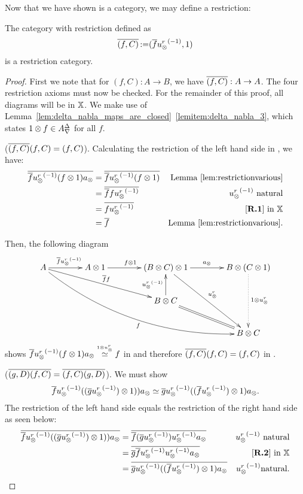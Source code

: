 Now that we have shown \Xt is a category, we may define a restriction:

\begin{lemma}\label{lem:xt_is_a_restriction_category}
  The category \Xt with restriction defined as
  \[
    \overline{(f,C)} \operatorname*{:\!=} (\overline{f}{u_{\otimes}^r}^{(-1)},1)
  \]
 is a restriction category.
\end{lemma}
\begin{proof}
  First we note that for $(f,C):A\to B$, we have $\overline{(f,C)}:A\to A$.
  The four restriction axioms must now be checked. For the remainder of
  this proof, all diagrams will be in $\mathbb{X}$. We make use of
  Lemma~\ref{lem:delta_nabla_maps_are_closed}~\ref{lemitem:delta_nabla_3},  which states $1\otimes f \in
  {A}^{\Delta}_{\nabla}$ for all $f$.

  \rone ($\overline{(f,C)} (f,C) = (f,C)$). Calculating the restriction of the left hand side in
      \X, we have:
      \begin{align*}
        \restr{\rst{f}\inv{\usr} (f\*1) a_{\*}} & = \restr{\rst{f}\inv{\usr} (f\*1)}
          & \text{Lemma \ref{lem:restrictionvarious}}\\
        & = \restr{\rst{f}f \inv{\usr}}  & \inv{\usr} \text{ natural}\\
        & = \restr{f \inv{\usr}}  & \text{ \rone in }\X\\
        & = \restr{f } & \text{Lemma \ref{lem:restrictionvarious}}.
      \end{align*}

      Then, the following diagram
      \[
        \xymatrix @C=40pt @R=25pt{
          A \ar[r]^{\restr{f} \inv{\usr}}
          \ar @/_25pt/[ddrrr]_f  \ar[drr]^{\restr{f}f}
          &A \* 1 \ar[r]^{f\* 1}
          &(B \* C) \* 1 \ar[r]^{a_{\*}} \ar[ddr]^{\usr}
          &B \* (C \* 1) \ar@{.>}[dd]^{1 \* {\usr}}\\
          &&B\*C \ar[u]^{\inv{\usr}} \ar@{=} [dr]\\
          && &B \* C
        }
      \]
      shows $\overline{f}{u_{\otimes}^r}^{(-1)} (f\otimes1) a_{\otimes} \overset{\scriptscriptstyle 1 \otimes {\ensuremath{u_{\otimes}^r}}}{\simeq} f$ in \X and therefore
      $\overline{(f,C)} (f,C) = (f,C)$ in \Xt.

     \rtwo ($\overline{(g,D)} \overline{(f,C)} = \overline{(f,C)} \overline{(g,D)}$). We must show
      \begin{equation}
        \overline{f}{u_{\otimes}^r}^{(-1)} ((\overline{g}{u_{\otimes}^r}^{(-1)})\otimes1)) a_{\otimes} \overset{\scriptscriptstyle }{\simeq}
        \overline{g}{u_{\otimes}^r}^{(-1)}((\overline{f}{u_{\otimes}^r}^{(-1)})\otimes1) a_{\otimes}.
        \label{eq:rtwo_in_xt}
      \end{equation}
      The restriction of the left hand
      side equals the restriction of the right hand side as seen below:
      \begin{align*}
        \restr{\rst{f}\inv{\usr} ((\restr{g}\inv\usr)\*1)) a_{\*}}
        & = \restr{\rst{f}(\restr{g}\inv\usr)\inv{\usr} a_{\*}} & \inv{\usr}   \text{ natural}\\
        & = \restr{\rst{g}\restr{f}\inv\usr\inv{\usr} a_{\*}} &  \text{\rtwo in }\X\\
        & = \restr{\rst{g}\inv{\usr}((\restr{f}\inv\usr)\*1) a_{\*}} & \inv{\usr}   \text{natural}.
      \end{align*}


\end{proof}
